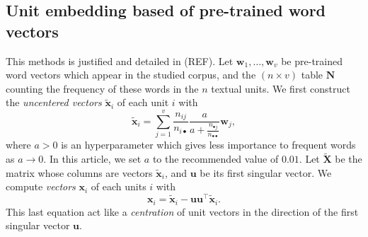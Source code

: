 \documentclass[
twocolumn,
]{ceurart}
\begin{document}
\subsection{Unit embedding based of pre-trained word vectors}
\label{wv_details}

This methods is justified and detailed in (REF). Let $\mathbf{w}_1, \ldots, \mathbf{w}_v$ be pre-trained word vectors which appear in the studied corpus, and the $(n \times v)$ table $\mathbf{N}$ counting the frequency of these words in the $n$ textual units. We first construct the \emph{uncentered vectors} $\widetilde{\mathbf{x}}_i$ of each unit $i$ with
\begin{equation}
\widetilde{\mathbf{x}}_i = \sum_{j = 1}^v \frac{n_{ij}}{n_{i \bullet}} \frac{a}{a + \frac{n_{\bullet j}}{n_{\bullet \bullet}}} \mathbf{w}_j,
\end{equation}
where $a > 0$ is an hyperparameter which gives less importance to frequent words as $a \to 0$. In this article, we set $a$ to the recommended value of $0.01$. Let $\widetilde{\mathbf{X}}$ be the matrix whose columns are vectors $\widetilde{\mathbf{x}}_i$, and $\mathbf{u}$ be its first singular vector. We compute \emph{vectors} $\mathbf{x}_i$ of each units $i$ with
\begin{equation}
\mathbf{x}_i = \widetilde{\mathbf{x}}_i - \mathbf{u}\mathbf{u}^\top \widetilde{\mathbf{x}}_i.
\end{equation}
This last equation act like a \emph{centration} of unit vectors in the direction of the first singular vector $\mathbf{u}$.


\end{document}
